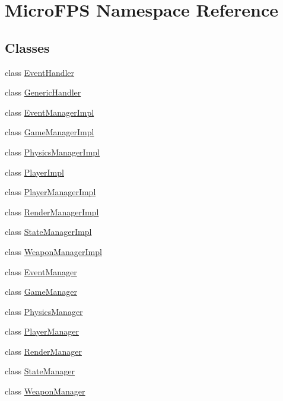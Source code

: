 \hypertarget{namespace_micro_f_p_s}{
\section{MicroFPS Namespace Reference}
\label{d4/d58/namespace_micro_f_p_s}
}
\subsection*{Classes}
\begin{DoxyCompactItemize}
\item 
class \hyperlink{class_micro_f_p_s_1_1_event_handler}{EventHandler}
\item 
class \hyperlink{class_micro_f_p_s_1_1_generic_handler}{GenericHandler}
\item 
class \hyperlink{class_micro_f_p_s_1_1_event_manager_impl}{EventManagerImpl}
\item 
class \hyperlink{class_micro_f_p_s_1_1_game_manager_impl}{GameManagerImpl}
\item 
class \hyperlink{class_micro_f_p_s_1_1_physics_manager_impl}{PhysicsManagerImpl}
\item 
class \hyperlink{class_micro_f_p_s_1_1_player_impl}{PlayerImpl}
\item 
class \hyperlink{class_micro_f_p_s_1_1_player_manager_impl}{PlayerManagerImpl}
\item 
class \hyperlink{class_micro_f_p_s_1_1_render_manager_impl}{RenderManagerImpl}
\item 
class \hyperlink{class_micro_f_p_s_1_1_state_manager_impl}{StateManagerImpl}
\item 
class \hyperlink{class_micro_f_p_s_1_1_weapon_manager_impl}{WeaponManagerImpl}
\item 
class \hyperlink{class_micro_f_p_s_1_1_event_manager}{EventManager}
\item 
class \hyperlink{class_micro_f_p_s_1_1_game_manager}{GameManager}
\item 
class \hyperlink{class_micro_f_p_s_1_1_physics_manager}{PhysicsManager}
\item 
class \hyperlink{class_micro_f_p_s_1_1_player_manager}{PlayerManager}
\item 
class \hyperlink{class_micro_f_p_s_1_1_render_manager}{RenderManager}
\item 
class \hyperlink{class_micro_f_p_s_1_1_state_manager}{StateManager}
\item 
class \hyperlink{class_micro_f_p_s_1_1_weapon_manager}{WeaponManager}
\item 

\end{DoxyCompactItemize}
